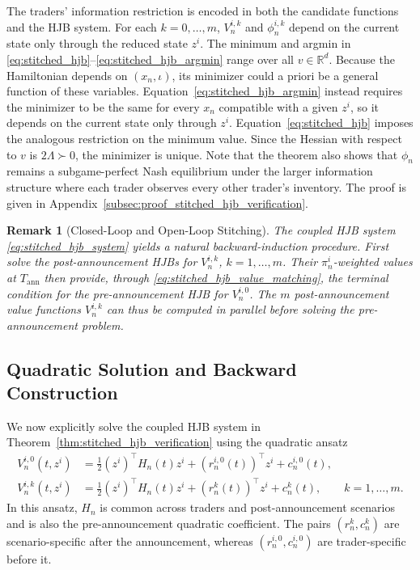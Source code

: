 \documentclass[12pt]{article}
\numberwithin{equation}{section}
\newtheorem{remark}[theorem]{Remark}
\theoremstyle{definition}
\begin{document}
The traders' information restriction is encoded in both the candidate
functions and the HJB system. For each \(k=0,\ldots,m\), \(V_n^{i,k}\) and
\(\phi_n^{i,k}\) depend on the current state only through the reduced state
\(z^i\). The minimum and argmin in
\eqref{eq:stitched_hjb}--\eqref{eq:stitched_hjb_argmin} range over all
\(v\in\mathbb R^d\). Because the Hamiltonian depends on \((x_n,\iota)\), its
minimizer could a priori be a general function of these variables.
Equation~\eqref{eq:stitched_hjb_argmin} instead requires the minimizer to be
the same for every \(x_n\) compatible with a given \(z^i\), so it depends on
the current state only through \(z^i\). Equation~\eqref{eq:stitched_hjb}
imposes the analogous restriction on the minimum value. Since the Hessian with
respect to \(v\) is \(2\Lambda\succ0\), the minimizer is unique.
Note that the theorem also shows that \(\phi_n\) remains a
subgame-perfect Nash equilibrium under the larger information structure where
each trader observes every other
trader's inventory. The proof is given in
Appendix~\ref{subsec:proof_stitched_hjb_verification}.

\begin{remark}[Closed-Loop and Open-Loop Stitching]
The coupled HJB system \eqref{eq:stitched_hjb_system} yields a natural
backward-induction procedure. First solve the post-announcement HJBs for
\(V_n^{i,k}\), \(k=1,\ldots,m\). Their \(\pi_n^i\)-weighted values at
\(T_{\mathrm{ann}}\) then provide, through
\eqref{eq:stitched_hjb_value_matching}, the terminal condition for the
pre-announcement HJB for \(V_n^{i,0}\). The \(m\) post-announcement value
functions \(V_n^{i,k}\) can thus be computed in parallel before solving the
pre-announcement problem.
\end{remark}

\subsection{Quadratic Solution and Backward Construction}
\label{sec:fixed_interval_lq_game}
\label{sec:full_procedure}

We now explicitly solve the coupled HJB system in
Theorem~\ref{thm:stitched_hjb_verification} using the quadratic ansatz
\begin{equation}\label{eq:quadratic_value_ansatz}
\begin{aligned}
V_n^{i,0}(t,z^i)
&=
\frac{1}{2}(z^i)^\top H_n(t)z^i
+(r_n^{i,0}(t))^\top z^i+c_n^{i,0}(t),\\
V_n^{i,k}(t,z^i)
&=
\frac{1}{2}(z^i)^\top H_n(t)z^i
+(r_n^k(t))^\top z^i+c_n^k(t),
\qquad k=1,\ldots,m.
\end{aligned}
\end{equation}
In this ansatz, \(H_n\) is common across traders and post-announcement
scenarios and is also the pre-announcement quadratic coefficient. The pairs
\((r_n^k,c_n^k)\) are scenario-specific after the announcement, whereas
\((r_n^{i,0},c_n^{i,0})\) are trader-specific before it.
\end{document}
